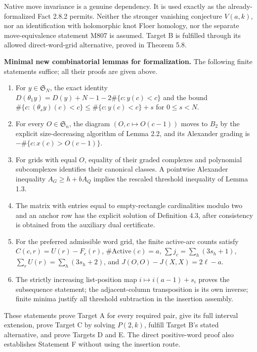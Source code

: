 \documentclass[11pt,a4paper]{article}
\begin{document}
Native move invariance is a genuine dependency. It is used
exactly as the already-formalized Fact 2.8.2 permits. Neither
the stronger vanishing conjecture $V(a,k)$, nor an
identification with holomorphic knot Floer homology, nor
the separate move-equivalence statement M807 is assumed.
Target B is fulfilled through its allowed direct-word-grid
alternative, proved in Theorem 5.8.

\textbf{Minimal new combinatorial lemmas for formalization.}
The following finite statements suffice; all their proofs
are given above.

\begin{enumerate}
\item For $y\in\mathfrak S_N$, the exact identity
$D(\theta_1y)=D(y)+N-1-2\#\{c:y(c)<c\}$ and the bound
$\#\{c:(\theta_s y)(c)<c\}\le\#\{c:y(c)<c\}+s$ for
$0\le s<N$.
\item For every $O\in\mathfrak S_n$, the diagram
$(O,c\mapsto O(c-1))$ moves to $B_2$ by the explicit
size-decreasing algorithm of Lemma 2.2, and its Alexander
grading is $-\#\{c:x(c)>O(c-1)\}$.
\item For grids with equal $O$, equality of their graded
complexes and polynomial subcomplexes identifies their
canonical classes. A pointwise Alexander inequality
$A_G\ge h+bA_Q$ implies the rescaled threshold inequality
of Lemma 1.3.
\item The matrix with entries equal to empty-rectangle
cardinalities modulo two and an anchor row has the
explicit solution of Definition 4.3, after consistency
is obtained from the auxiliary dual certificate.
\item For the preferred admissible word grid, the
finite active-arc counts satisfy
$C(c,r)=U(r)-F_c(r)$, $\#\mathrm{Active}(c)=a$,
$\sum j_c=\sum_h(3s_h+1)$,
$\sum_rU(r)=\sum_h(3s_h+2)$, and
$J(O,O)-J(X,X)=2\ell-a$.
\item The strictly increasing list-position map
$i\mapsto i(a-1)+s_i$ proves the subsequence statement;
the adjacent-column transposition is its own inverse;
finite minima justify all threshold subtraction in
the insertion assembly.
\end{enumerate}

These statements prove Target A for every required pair,
give its full interval extension, prove Target C by
solving $P(2,k)$, fulfill Target B's stated alternative,
and prove Targets D and E. The direct positive-word proof
also establishes Statement F without using the insertion
route.
\end{document}
